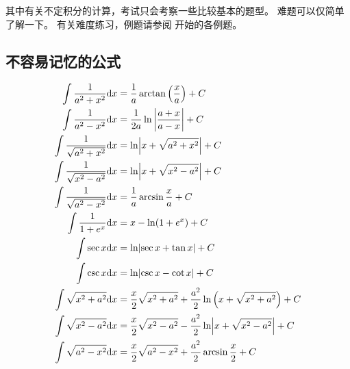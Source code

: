 其中有关不定积分的计算，考试只会考察一些比较基本的题型。
难题可以仅简单了解一下。
有关难度练习，例题请参阅 \cite[page 96]{we} 开始的各例题。

\subsection{不容易记忆的公式}

\begin{align}
    \label{eq:indefinite-integreal-equality-uneasy-to-recite-1}  \int \dfrac{1}{{a^2 + x^2}}         \mathrm dx &= \dfrac{1}{a} \arctan \left( \dfrac{x}{a} \right)      + C\\
    \label{eq:indefinite-integreal-equality-uneasy-to-recite-2}  \int \dfrac{1}{{a^2 - x^2}}         \mathrm dx &= \dfrac{1}{2a} \ln \left| \dfrac{a + x}{a - x} \right| + C\\
    \label{eq:indefinite-integreal-equality-uneasy-to-recite-3}  \int \dfrac{1}{{\sqrt{a^2 + x^2}}}  \mathrm dx &= \ln               \abs*{ x + \sqrt{a^2 + x^2} }       + C\\
    \label{eq:indefinite-integreal-equality-uneasy-to-recite-4}  \int \dfrac{1}{{\sqrt{x^2 - a^2}}}  \mathrm dx &= \ln               \abs*{ x + \sqrt{x^2 - a^2} }       + C\\
    \label{eq:indefinite-integreal-equality-uneasy-to-recite-5}  \int \dfrac{1}{{\sqrt{a^2 - x^2}}}  \mathrm dx &= \frac{1}{a} \arcsin \frac{x}{a}                       + C\\
    \label{eq:indefinite-integreal-equality-uneasy-to-recite-6}  \int \dfrac{1}{{1+e^x}}             \mathrm dx &= x - \ln (1+ e^x)                                      + C\\
    \label{eq:indefinite-integreal-equality-uneasy-to-recite-7}  \int \sec x                         \mathrm dx &= \ln \abs*{\sec x + \tan x }                           + C\\ 
    \label{eq:indefinite-integreal-equality-uneasy-to-recite-8}  \int \csc x                         \mathrm dx &= \ln \abs*{\csc x - \cot x }                           + C\\ 
    \label{eq:indefinite-integreal-equality-uneasy-to-recite-9}  \int \sqrt{x^2 + a^2}               \mathrm dx &= \frac{x}{2} \sqrt{x^2 + a^2} + \frac{a^2}{2} \ln \left(x + \sqrt{x^2 + a^2}\right) + C\\
    \label{eq:indefinite-integreal-equality-uneasy-to-recite-10} \int \sqrt{x^2 - a^2}               \mathrm dx &= \frac{x}{2} \sqrt{x^2 - a^2} - \frac{a^2}{2} \ln \abs*{x + \sqrt{x^2 - a^2}} + C\\
    \label{eq:indefinite-integreal-equality-uneasy-to-recite-11} \int \sqrt{a^2 - x^2}               \mathrm dx &= \frac{x}{2} \sqrt{a^2 - x^2} + \frac{a^2}{2} \arcsin \frac{x}{2} + C
\end{align}

